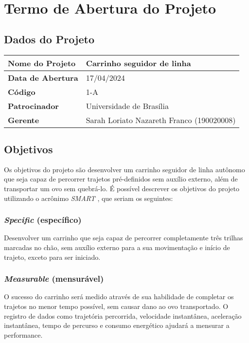 \chapter{Termo de Abertura do Projeto}

\section{Dados do Projeto}

\begin{center}
  \begin{tabular}{|l|l|}
    \hline
    \textbf{Nome do Projeto} & Carrinho seguidor de linha \\
    \hline
    \textbf{Data de Abertura} & 17/04/2024 \\
    \hline
    \textbf{Código} & 1-A \\
    \hline
    \textbf{Patrocinador} & Universidade de Brasília \\
    \hline
    \textbf{Gerente} & Sarah Loriato Nazareth Franco (190020008) \\
    \hline
  \end{tabular}
\end{center}

\section{Objetivos}

Os objetivos do projeto são desenvolver um carrinho seguidor de linha autônomo
que seja capaz de percorrer trajetos pré-definidos sem auxílio externo, além de
transportar um ovo sem quebrá-lo. É possível descrever os objetivos do projeto
utilizando o acrônimo \textit{SMART} \cite{SMART-Goals:2017}, que seriam os
seguintes:

\subsection{\textit{Specific} (específico)}

Desenvolver um carrinho que seja capaz de percorrer completamente três
trilhas marcadas no chão, sem auxílio externo para a sua movimentação e
início de trajeto, exceto para ser iniciado.
 
\subsection{\textit{Measurable} (mensurável)}

O sucesso do carrinho será medido através de sua habilidade de completar os
trajetos no menor tempo possível, sem causar dano ao ovo transportado. O
registro de dados como trajetória percorrida, velocidade instantânea,
aceleração instantânea, tempo de percurso e consumo energético ajudará a
mensurar a performance.

